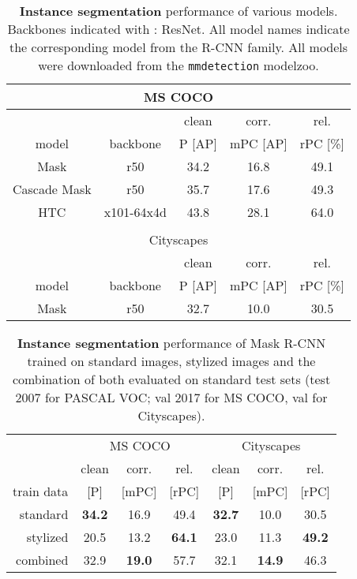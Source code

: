 \documentclass{article}
\begin{document}
\begin{table}[t!]
\begin{center}
\begin{tabular}{c|c|ccc}
\multicolumn{5}{c}{MS COCO} \\
\toprule
\multicolumn{2}{c}{} & clean & corr. & rel.\\
model & backbone & P \small{[AP]} & mPC \small{[AP]} & rPC \small{[\%]}\\
\hline
Mask & r50 & 34.2 & 16.8 & 49.1\\
Cascade Mask & r50 & 35.7 & 17.6 & 49.3\\
HTC & x101-64x4d & 43.8 & 28.1 & 64.0\\
\bottomrule


\multicolumn{5}{c}{} \\
\multicolumn{5}{c}{Cityscapes} \\
\toprule
\multicolumn{2}{c}{} & clean & corr. & rel.\\
model & backbone & P \small{[AP]} & mPC \small{[AP]} & rPC \small{[\%]}\\
\hline
Mask & r50 & 32.7 & 10.0 & 30.5\\
\bottomrule
\end{tabular}
\caption{\textbf{Instance segmentation} performance of various models. Backbones indicated with : ResNet. All model names indicate the corresponding model from the R-CNN family. All models were downloaded from the \texttt{mmdetection} modelzoo.}
\label{table:results_instance_segmentation}
\end{center}
\end{table}

\begin{table}[t!]
\begin{center}
\begin{tabular}{r|ccc|ccc}
\toprule
 & \multicolumn{3}{c|}{MS COCO} & \multicolumn{3}{c}{Cityscapes} \\
& clean & corr. & rel. & clean & corr. & rel. \\
train data & \small{[P]} & \small{[mPC]} & \small{[rPC]} & \small{[P]} & \small{[mPC]} & \small{[rPC]} \\
\hline
standard & \textbf{34.2} & 16.9 & 49.4 & \textbf{32.7} & 10.0 & 30.5\\
\hline
stylized & 20.5 & 13.2 & \textbf{64.1} & 23.0 & 11.3 & \textbf{49.2}\\
combined & 32.9 & \textbf{19.0} & 57.7 & 32.1 & \textbf{14.9} & 46.3\\
\bottomrule
\end{tabular}
\caption{\textbf{Instance segmentation} performance of Mask R-CNN trained on standard images, stylized images and the combination of both evaluated on standard test sets (test 2007 for PASCAL VOC; val 2017 for MS COCO, val for Cityscapes).}
\label{table:results_stylized_instance_segmentation}
\end{center}
\end{table}
\end{document}
